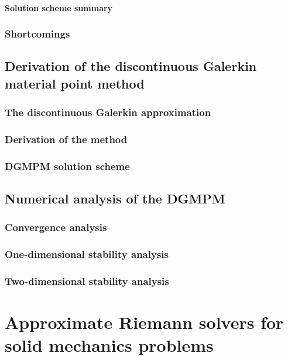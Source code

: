 \documentclass[10pt,a4paper]{report}
\begin{document}
	            \subsubsection{Solution scheme summary}
			\subsection{Shortcomings}
			
		
		\section{Derivation of the discontinuous Galerkin material point method}
			\subsection{The discontinuous Galerkin approximation}
            \subsection{Derivation of the method}
			\subsection{DGMPM solution scheme}
			
		\section{Numerical analysis of the DGMPM}
			\subsection{Convergence analysis}
			\subsection{One-dimensional stability analysis}
			\subsection{Two-dimensional stability analysis}

	\chapter{Approximate Riemann solvers for solid mechanics problems}
	
\end{document}
